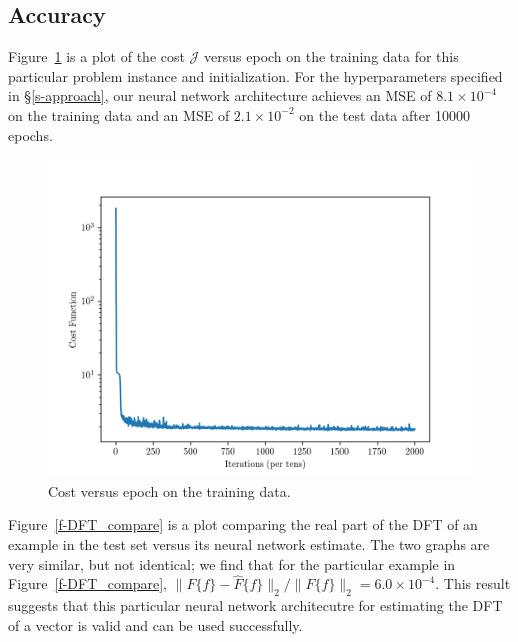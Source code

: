 \documentclass[12pt]{article}
\begin{document}
\subsection{Accuracy} 
Figure~\ref{f-example_cost_vs_epoch} is a plot of the cost $\mathcal J$ versus epoch on the training 
data for this particular problem instance and initialization. 
For the hyperparameters specified in \S\ref{s-approach}, our neural network architecture achieves an 
MSE of $8.1 \times 10^{-4}$ on the training data and an MSE of $2.1 \times 10^{-2}$ on the test data after 
10000 epochs.

\begin{figure}
\centering
\includegraphics[scale=.5]{figures/final_cost_vs_epoch.png}
\caption{Cost versus epoch on the training data.}
\label{f-example_cost_vs_epoch}
\end{figure}

Figure~\ref{f-DFT_compare} is a plot comparing the real part of the DFT of an example in the test set 
versus its neural network estimate. The two graphs are very similar, but not identical; we 
find that for the particular example in Figure~\ref{f-DFT_compare}, 
$\|F\{f\} - \hat{F}\{f\}\|_2 / \|F\{f\}\|_2 = 6.0 \times 10^{-4}$. This result suggests that this particular
neural network architecutre for estimating the DFT of a vector is valid and can be used successfully.
\end{document}
